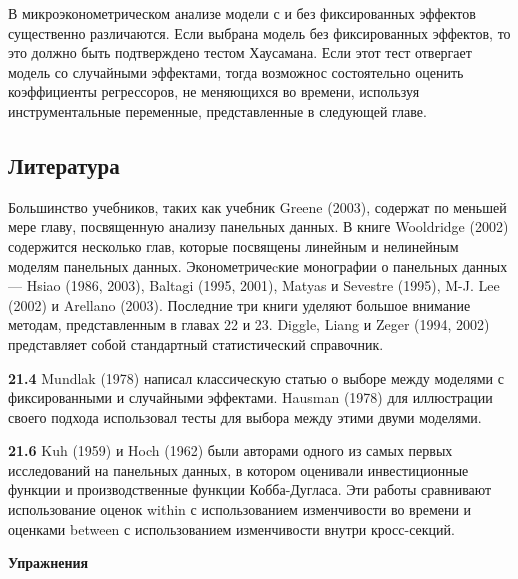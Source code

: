 В микроэконометрическом анализе модели с и без фиксированных эффектов существенно различаются. Если выбрана модель без фиксированных эффектов, то это должно быть подтверждено тестом Хаусамана. Если этот тест отвергает модель со случайными эффектами, тогда возможнос состоятельно оценить коэффициенты  регрессоров, не меняющихся во времени,  используя инструментальные переменные, представленные в следующей главе.

\subsection{Литература}

Большинство учебников, таких как учебник Greene (2003), содержат по меньшей мере главу, посвященную анализу панельных данных. В книге Wooldridge (2002) содержится несколько глав, которые посвящены линейным и нелинейным моделям панельных данных. Эконометричеcкие монографии о панельных данных  --- Hsiao (1986, 2003), Baltagi (1995, 2001), Matyas и Sevestre (1995), M-J. Lee (2002) и Arellano (2003). Последние три книги уделяют большое внимание методам, представленным в главах 22 и 23. Diggle, Liang и Zeger (1994, 2002) представляет собой стандартный статистический справочник.

\textbf{21.4} Mundlak (1978) написал классическую статью о выборе между моделями с фиксированными и случайными эффектами. Hausman (1978) для иллюстрации своего подхода использовал тесты для выбора между этими двуми моделями.

\textbf{21.6} Kuh (1959) и Hoch (1962) были авторами одного из самых первых исследований на панельных данных, в котором оценивали инвестиционные функции и производственные функции Кобба-Дугласа. Эти работы сравнивают использование оценок within с использованием изменчивости во времени и оценками between с использованием изменчивости внутри кросс-секций.


 {\centering
{\bf Упражнения}\\}

